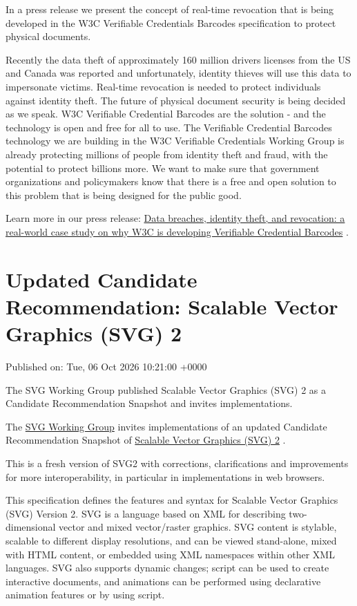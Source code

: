 \documentclass[11pt,a4paper]{article}
\begin{document}
In a press release we present the concept of real-time revocation that is being developed in the W3C Verifiable Credentials Barcodes specification to protect physical documents.

Recently the data theft of approximately 160 million drivers licenses from the US and Canada was reported and unfortunately, identity thieves will use this data to impersonate victims. Real-time revocation is needed to protect individuals against identity theft. The future of physical document security is being decided as we speak. W3C Verifiable Credential Barcodes are the solution - and the technology is open and free for all to use. The Verifiable Credential Barcodes technology we are building in the W3C Verifiable Credentials Working Group is already protecting millions of people from identity theft and fraud, with the potential to protect billions more. We want to make sure that government organizations and policymakers know that there is a free and open solution to this problem that is being designed for the public good.

Learn more in our press release: \href{https://www.w3.org/press-releases/2026/data-breaches-identity-theft-and-revocation-a-real-world-case-study-on-why-w3c-is-developing-verifiable-credential-barcodes/}{Data breaches, identity theft, and revocation: a real-world case study on why W3C is developing Verifiable Credential Barcodes} .

\section{Updated Candidate Recommendation: Scalable Vector Graphics (SVG) 2}

Published on: Tue, 06 Oct 2026 10:21:00 +0000

The SVG Working Group published Scalable Vector Graphics (SVG) 2 as a Candidate Recommendation Snapshot and invites implementations.

The \href{https://www.w3.org/groups/wg/svg/}{SVG Working Group} invites implementations of an updated Candidate Recommendation Snapshot of \href{https://www.w3.org/TR/2026/CR-SVG2-20261006/}{Scalable Vector Graphics (SVG) 2} .

This is a fresh version of SVG2 with corrections, clarifications and improvements for more interoperability, in particular in implementations in web browsers.

This specification defines the features and syntax for Scalable Vector Graphics (SVG) Version 2. SVG is a language based on XML for describing two-dimensional vector and mixed vector/raster graphics. SVG content is stylable, scalable to different display resolutions, and can be viewed stand-alone, mixed with HTML content, or embedded using XML namespaces within other XML languages. SVG also supports dynamic changes; script can be used to create interactive documents, and animations can be performed using declarative animation features or by using script.
\end{document}
